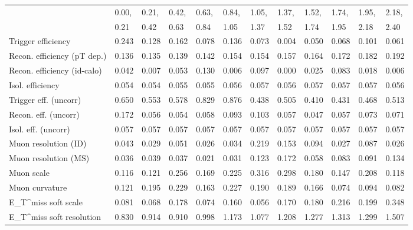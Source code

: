\begin{tabular}{l|p{0.6cm}p{0.6cm}p{0.6cm}p{0.6cm}p{0.6cm}p{0.6cm}p{0.6cm}p{0.6cm}p{0.6cm}p{0.6cm}p{0.6cm}}
\hline
   & 0.00, & 0.21, & 0.42, & 0.63, & 0.84, & 1.05, & 1.37, & 1.52, & 1.74, & 1.95, & 2.18,  \\ 
   & 0.21 & 0.42 & 0.63 & 0.84 & 1.05 & 1.37 & 1.52 & 1.74 & 1.95 & 2.18 & 2.40  \\ 
\hline
Trigger efficiency                       & 0.243 & 0.128 & 0.162 & 0.078 & 0.136 & 0.073 & 0.004 & 0.050 & 0.068 & 0.101 & 0.061 \\
Recon. efficiency (pT dep.)              & 0.136 & 0.135 & 0.139 & 0.142 & 0.154 & 0.154 & 0.157 & 0.164 & 0.172 & 0.182 & 0.192 \\
Recon. efficiency (id-calo)              & 0.042 & 0.007 & 0.053 & 0.130 & 0.006 & 0.097 & 0.000 & 0.025 & 0.083 & 0.018 & 0.006 \\
Isol. efficiency                         & 0.054 & 0.054 & 0.055 & 0.055 & 0.056 & 0.057 & 0.056 & 0.057 & 0.057 & 0.057 & 0.056 \\
Trigger eff. (uncorr)                    & 0.650 & 0.553 & 0.578 & 0.829 & 0.876 & 0.438 & 0.505 & 0.410 & 0.431 & 0.468 & 0.513 \\
Recon. eff. (uncorr)                     & 0.172 & 0.056 & 0.054 & 0.058 & 0.093 & 0.103 & 0.057 & 0.047 & 0.057 & 0.073 & 0.071 \\
Isol. eff. (uncorr)                      & 0.057 & 0.057 & 0.057 & 0.057 & 0.057 & 0.057 & 0.057 & 0.057 & 0.057 & 0.057 & 0.057 \\
Muon resolution (ID)                     & 0.043 & 0.029 & 0.051 & 0.026 & 0.034 & 0.219 & 0.153 & 0.094 & 0.027 & 0.087 & 0.026 \\
Muon resolution (MS)                     & 0.036 & 0.039 & 0.037 & 0.021 & 0.031 & 0.123 & 0.172 & 0.058 & 0.083 & 0.091 & 0.134 \\
Muon scale                               & 0.116 & 0.121 & 0.256 & 0.169 & 0.225 & 0.316 & 0.298 & 0.180 & 0.147 & 0.208 & 0.118 \\
Muon curvature                           & 0.121 & 0.195 & 0.229 & 0.163 & 0.227 & 0.190 & 0.189 & 0.166 & 0.074 & 0.094 & 0.082 \\
E_{T}^{miss} soft scale                  & 0.081 & 0.068 & 0.178 & 0.074 & 0.160 & 0.056 & 0.170 & 0.180 & 0.216 & 0.199 & 0.348 \\
E_{T}^{miss} soft resolution             & 0.830 & 0.914 & 0.910 & 0.998 & 1.173 & 1.077 & 1.208 & 1.277 & 1.313 & 1.299 & 1.507 \\

\end{tabular}
